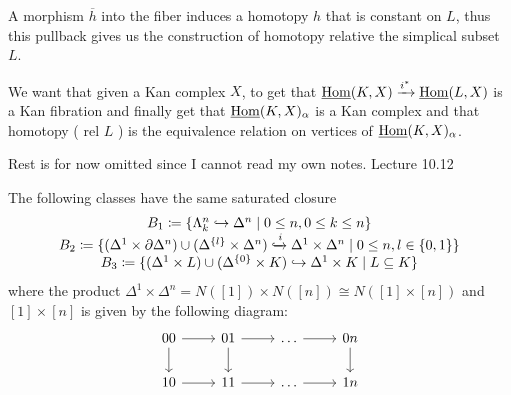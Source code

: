 A morphism $\overline{h}$ into the fiber induces a homotopy $ h $ that is constant on $L$, thus this pullback gives us the construction of homotopy relative the simplical subset $L$.

We want that given a Kan complex $X$, to get that $ \underline{\operatorname{Hom}} ( K , X ) \xrightarrow{i^*} \underline{\operatorname{Hom}} ( L , X ) $ is a Kan fibration and finally get that $ \underline{ \operatorname{Hom} } ( K , X )_{\alpha} $ is a Kan complex and that homotopy ( rel $L$ ) is the equivalence relation on vertices of $ \underline{ \operatorname{Hom} } ( K , X )_{\alpha}$.

Rest is for now omitted since I cannot read my own notes.
Lecture 10.12

\begin{prop}
    The following classes have the same saturated closure
     \[
     \begin{tabular}{c}
          $B_1\coloneqq \{\Lambda_k^n \hookrightarrow\Delta^n \mid 0\leq n,0 \leq k \leq n \}$
          \\
          $B_2\coloneqq \{(\Delta^1 \times \partial \Delta^n) \cup(\Delta^{\{l\}} \times \Delta^n) \xhookrightarrow{i} \Delta^1 \times \Delta^n \mid 0 \leq n, l \in \{0,1\}\}$
          \\
          $B_3 \coloneqq
          \{ ( \Delta^1 \times L) \cup(\Delta^{\{0\}} \times K) \hookrightarrow \Delta^1 \times K \mid L \subseteq K \}$
     \end{tabular}
     \]
     where the product $\Delta^1 \times \Delta^n = N ( [1]) \times N([n]) \cong N ( [1] \times [n] )$ and $[1] \times [n] $ is given by the following diagram:
     \[
     \begin{tikzcd}
         00
         \ar[r]
         \ar[d]
         &
         01
         \ar[r]
         \ar[d]
         &
         \dotsc
         \ar[r]
         &
         0n
         \ar[d]
         \\
         10 
         \ar[r]
         &
         11
         \ar[r]
         &
         \dotsc
         \ar[r]
         &
         1n
     \end{tikzcd}
     \]
\end{prop}

